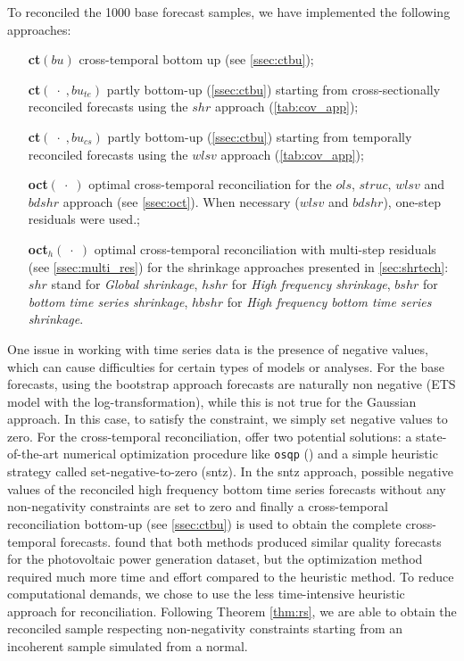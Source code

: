 \documentclass[a4paper,11pt]{article}
\theoremstyle{definition}
\begin{document}
To reconciled the 1000 base forecast samples, we have implemented the following approaches:
\begin{itemize}[nosep, leftmargin = 2.5cm]
	\item[\textbf{ct}$(bu)$] cross-temporal bottom up (see \autoref{ssec:ctbu});
	\item[\textbf{ct}$(\;\cdot\;, bu_{te})$] partly bottom-up (\autoref{ssec:ctbu}) starting from cross-sectionally reconciled forecasts using the $shr$ approach (\autoref{tab:cov_app});
	\item[\textbf{ct}$(\;\cdot\;, bu_{cs})$] partly bottom-up (\autoref{ssec:ctbu}) starting from temporally reconciled forecasts using the $wlsv$ approach (\autoref{tab:cov_app});
	\item[\textbf{oct}$(\;\cdot\;)$] optimal cross-temporal reconciliation for the $ols$, $struc$, $wlsv$ and $bdshr$ approach (see \autoref{ssec:oct}). When necessary ($wlsv$ and $bdshr$), one-step residuals were used.;
	\item[\textbf{oct}$_{h}(\;\cdot\;)$] optimal cross-temporal reconciliation with multi-step residuals (see \autoref{ssec:multi_res}) for the shrinkage approaches presented in \autoref{sec:shrtech}: $shr$ stand for \textit{Global shrinkage}, $hshr$ for \textit{High frequency shrinkage}, $bshr$ for \textit{bottom time series shrinkage}, $hbshr$ for \textit{High frequency bottom time series shrinkage}.
\end{itemize}
One issue in working with time series data is the presence of negative values, which can cause difficulties for certain types of models or analyses.
For the base forecasts, using the bootstrap approach forecasts are naturally non negative (ETS model with the log-transformation), while this is not true for the Gaussian approach. In this case, to satisfy the constraint, we simply set negative values to zero. For the cross-temporal reconciliation, \citet{difonzo2023} offer two potential solutions: a state-of-the-art numerical optimization procedure like \texttt{osqp} (\citealp{stellato2019, stellato2020}) and a simple heuristic strategy called set-negative-to-zero (sntz). In the sntz approach, possible negative values of the reconciled high frequency bottom time series forecasts without any non-negativity constraints are set to zero and finally a cross-temporal reconciliation bottom-up (see \autoref{ssec:ctbu}) is used to obtain the complete cross-temporal forecasts. \cite{difonzo2023a} found that both methods produced similar quality forecasts for the photovoltaic power generation dataset, but the optimization method required much more time and effort compared to the heuristic method. To reduce computational demands, we chose to use the less time-intensive heuristic approach for reconciliation. Following Theorem \ref{thm:rs}, we are able to obtain the reconciled sample respecting non-negativity constraints starting from an incoherent sample simulated from a normal.
\end{document}
